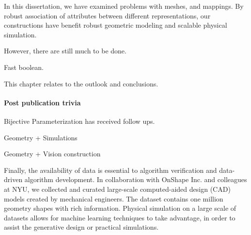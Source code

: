 In this dissertation, we have examined problems with meshes, and mappings. By robust association of attributes between different representations, our constructions have benefit robust geometric modeling and scalable physical simulation.

However, there are still much to be done.

Fast boolean.

This chapter relates to the outlook and conclusions.

\paragraph*{Post publication trivia}
Bijective Parameterization has received follow ups.

Geometry + Simulations

Geometry + Vision construction

Finally, the availability of data is essential to algorithm verification and data-driven algorithm development. In collaboration with OnShape Inc. and colleagues at NYU, we collected and curated large-scale computed-aided design (CAD) models created by mechanical engineers. The dataset contains one million geometry shapes with rich information. 
Physical simulation on a large scale of datasets allows for machine learning techniques to take advantage, in order to assist the generative design or practical simulations.